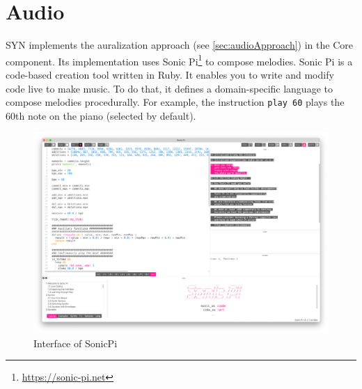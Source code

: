 \section{Audio}
SYN implements the auralization approach (see \autoref{sec:audioApproach}) in the Core component. 
Its implementation uses Sonic Pi\footnote{\url{https://sonic-pi.net}} to compose melodies. Sonic Pi is a code-based creation tool written in Ruby. It enables you to write and modify code live to make music. To do that, it defines a domain-specific language to compose melodies procedurally. For example, the instruction \texttt{play 60} plays the 60th note on the piano (selected by default). 

\begin{figure}
    \center
    \includegraphics[width=\textwidth]{SonicPi.png}
    \caption{Interface of SonicPi}
    \label{fig:sonicpi}
\end{figure}

